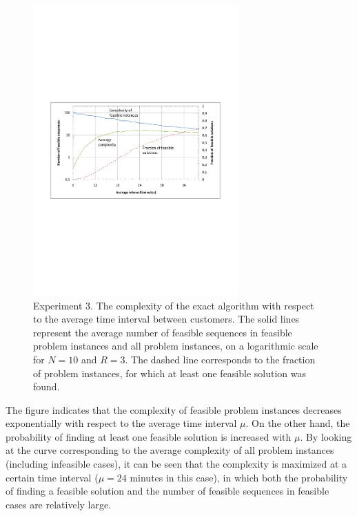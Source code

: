 \documentclass[dissertation,draft*]{aaltoseries}
\begin{document}
\begin{figure}
\centering
\includegraphics[width=0.7\textwidth]{intvertailu01.pdf}
\caption{Experiment 3. The complexity of the exact algorithm with respect to the average time 
interval between customers. The solid lines represent the average number of feasible sequences in
feasible problem instances and all problem instances, on a logarithmic scale for $N=10$ and $R=3$.
The dashed line corresponds to the fraction
of problem instances, for which at least one feasible solution was found.}
\label{intvertailu01}
\end{figure}



The figure indicates that the complexity of feasible problem instances decreases exponentially 
with respect to the average time interval $\mu$. On the other hand, the probability of finding
at least one feasible solution is increased with $\mu$. By looking at the curve corresponding 
to the average complexity of all problem instances (including infeasible cases), it can be seen that the
complexity is maximized at a certain time interval ($\mu = 24$ minutes in this case), in which both the probability of
finding a feasible solution and the number of feasible sequences in feasible cases are relatively large.

\end{document}
